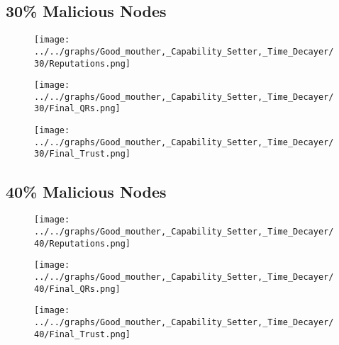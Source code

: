 \begin{minipage}[t]{0.49\columnwidth}
\subsection*{30\% Malicious Nodes}
    \begin{figure}[H]
        \centering
        \texttt{[image: ../../graphs/Good\_mouther,\_Capability\_Setter,\_Time\_Decayer/30/Reputations.png]}
    \end{figure}
    \begin{figure}[H]
        \centering
        \texttt{[image: ../../graphs/Good\_mouther,\_Capability\_Setter,\_Time\_Decayer/30/Final\_QRs.png]}
    \end{figure}
\end{minipage}
\begin{minipage}[t]{0.49\columnwidth}
    \begin{figure}[H]
        \centering
        \texttt{[image: ../../graphs/Good\_mouther,\_Capability\_Setter,\_Time\_Decayer/30/Final\_Trust.png]}
    \end{figure}
\end{minipage}

\begin{minipage}[t]{0.49\columnwidth}
\subsection*{40\% Malicious Nodes}
    \begin{figure}[H]
        \centering
        \texttt{[image: ../../graphs/Good\_mouther,\_Capability\_Setter,\_Time\_Decayer/40/Reputations.png]}
    \end{figure}
    \begin{figure}[H]
        \centering
        \texttt{[image: ../../graphs/Good\_mouther,\_Capability\_Setter,\_Time\_Decayer/40/Final\_QRs.png]}
    \end{figure}
\end{minipage}
\begin{minipage}[t]{0.49\columnwidth}
    \begin{figure}[H]
        \centering
        \texttt{[image: ../../graphs/Good\_mouther,\_Capability\_Setter,\_Time\_Decayer/40/Final\_Trust.png]}
    \end{figure}
\end{minipage}


